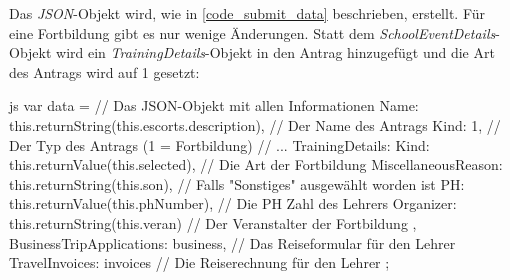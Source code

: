 Das \textit{JSON}-Objekt wird, wie in \autoref{code_submit_data} beschrieben, erstellt. Für eine Fortbildung gibt es nur wenige Änderungen.
Statt dem \textit{SchoolEventDetails}-Objekt wird ein \textit{TrainingDetails}-Objekt in den Antrag hinzugefügt und die Art des Antrags wird auf 1 gesetzt:
\begin{code}{js}
var data = {		// Das JSON-Objekt mit allen Informationen
	Name: this.returnString(this.escorts.description),	// Der Name des Antrags
	Kind: 1,	// Der Typ des Antrags (1 = Fortbildung)
	// ...
	TrainingDetails: {
		Kind: this.returnValue(this.selected),	// Die Art der Fortbildung
		MiscellaneousReason: this.returnString(this.son),	// Falls "Sonstiges" ausgewählt worden ist
		PH: this.returnValue(this.phNumber),	// Die PH Zahl des Lehrers
		Organizer: this.returnString(this.veran)	// Der Veranstalter der Fortbildung
	},
	BusinessTripApplications: business,	// Das Reiseformular für den Lehrer
	TravelInvoices: invoices	// Die Reiserechnung für den Lehrer
};
\end{code}
~\\
\newpage
